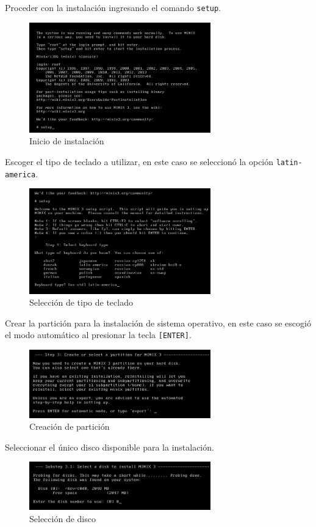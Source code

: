 \documentclass[12pt]{article}
\begin{document}
Proceder con la instalación ingresando el comando \texttt{setup}.
\begin{figure}[H]
  \centering
  \includegraphics[width=0.7\textwidth]{vm/min18.png}
  \caption{Inicio de instalación}
\end{figure}

Escoger el tipo de teclado a utilizar, en este caso se seleccionó la opción \texttt{latin-america}.
\begin{figure}[H]
  \centering
  \includegraphics[width=0.7\textwidth]{vm/min19.png}
  \caption{Selección de tipo de teclado}
\end{figure}

Crear la partición para la instalación de sistema operativo, en este caso se escogió el modo automático al presionar la tecla \texttt{[ENTER]}.
\begin{figure}[H]
  \centering
  \includegraphics[width=0.7\textwidth]{vm/min20.png}
  \caption{Creación de partición}
\end{figure}

Seleccionar el único disco disponible para la instalación.
\begin{figure}[H]
  \centering
  \includegraphics[width=0.7\textwidth]{vm/min21.png}
  \caption{Selección de disco}
\end{figure}
\end{document}
